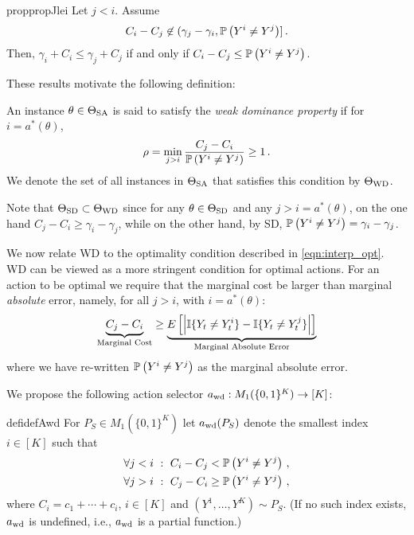 \begin{restatable}{prop}{propJlei}
\label{prop:jlei}
Let $j<i$. Assume
\begin{align}
\label{eq:cond2}
C_i - C_j \not\in (\gamma_j - \gamma_i, \mathbb{P}\left(Y^i \ne Y^j\right) ]\,.
\end{align}
Then, $\gamma_i + C_i \le \gamma_j + C_j$ if and only if $C_i - C_j \le \mathbb{P}\left(Y^i \ne Y^j\right)$.
\end{restatable}

These results motivate the following definition:
\begin{defi}
	An instance $\theta \in \Theta_{\mathrm{SA}}$  is said to satisfy the \emph{weak dominance property} if 
	for $i = a^*(\theta)$,
	\begin{align}
	\label{eq:wd} \rho = \min_{j > i} \frac{C_j - C_i}{\mathbb{P}\left(Y^i\ne Y^j\right)} \ge 1 \,.
	\end{align}
We denote the set of all instances in $\Theta_{\mathrm{SA}}$ that satisfies this condition by $\Theta_{\mathrm{WD}}$.	
\end{defi}
Note that $\Theta_{\mathrm{SD}}\subset \Theta_{\mathrm{WD}}$ since for any $\theta\in \Theta_{\mathrm{SD}}$ and any $j>i = a^*(\theta)$, on the one hand $C_j - C_i \ge \gamma_i - \gamma_j$, while on the other hand, by SD, $\mathbb{P}\left(Y^i\ne Y^j\right) = \gamma_i - \gamma_j$.

We now relate WD to the optimality condition described in \cref{eqn:interp_opt}. WD can be viewed as a more stringent condition for optimal actions. For an action to be optimal we require that the marginal cost be larger than marginal \emph{absolute} error, namely, for all $j > i$, with $i = a^*(\theta)$:
\begin{equation} \label{eqn:interp_WD}
\underbrace{C_j - C_i}_{\text{Marginal Cost}} \geq \underbrace{ E \left [ \left | \mathbb{I}\{Y_t \ne Y_t^i\} - \mathbb{I}\{Y_t \ne Y_t^j\} \right | \right ]}_{\text{Marginal Absolute Error}}
\end{equation}
where we have re-written $\mathbb{P}\left(Y^i\ne Y^j\right)$ as the marginal absolute error. 


We propose the following action selector $a_{\mathrm{wd}}: M_1(\{0,1\}^K)  \to [K]$:
\begin{restatable}{defi}{defAwd}
\label{def:awd}
For $P_S \in M_1(\{0,1\}^K) $ let $a_{\mathrm{wd}}(P_S)$ denote the smallest index $i\in [K]$ such that
\begin{subequations}
\begin{align}
\forall j<i \,\,:\,\, C_i - C_j < \mathbb{P}\left( Y^i \ne Y^j \right)\,, \label{eq:wd1}\\ 
\forall j>i \,\,:\,\, C_j - C_i \ge \mathbb{P}\left( Y^i \ne Y^j \right)\,, \label{eq:wd2}
\end{align}
\end{subequations}
where $C_i = c_1+\cdots + c_i$, $i\in [K]$ and $(Y^1,\dots,Y^K) \sim P_S$.
(If no such index exists, $a_{\mathrm{wd}}$ is undefined, i.e., $a_{\mathrm{wd}}$ is a partial function.)
\end{restatable}

